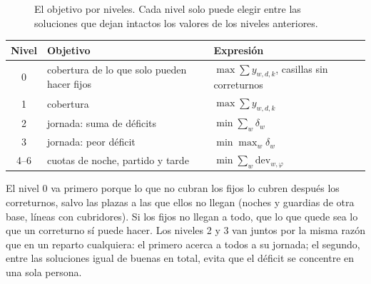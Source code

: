\documentclass[11pt,a4paper]{article}
\begin{document}
\begin{figure}[ht]
\centering
{}
\caption{El objetivo por niveles. Cada nivel solo puede elegir entre las soluciones que dejan
intactos los valores de los niveles anteriores.}
\label{fig:niveles}
\end{figure}

\begin{center}
\begin{tabular}{@{}cll@{}}
  \toprule
  Nivel & Objetivo & Expresión \\
  \midrule
  0 & cobertura de lo que solo pueden hacer fijos & $\max \sum y_{w,d,k}$, casillas sin correturnos \\
  1 & cobertura & $\max \sum y_{w,d,k}$ \\
  2 & jornada: suma de déficits & $\min \sum_w \delta_w$ \\
  3 & jornada: peor déficit & $\min \max_w \delta_w$ \\
  4--6 & cuotas de noche, partido y tarde & $\min \sum_w \mathrm{dev}_{w,\varphi}$ \\
  \bottomrule
\end{tabular}
\end{center}
El nivel 0 va primero porque lo que no cubran los fijos lo cubren después los correturnos, salvo
las plazas a las que ellos no llegan (noches y guardias de otra base, líneas con cubridores). Si
los fijos no llegan a todo, que lo que quede sea lo que un correturno sí puede hacer. Los niveles
2 y 3 van juntos por la misma razón que en un reparto cualquiera: el primero acerca a todos a su
jornada; el segundo, entre las soluciones igual de buenas en total, evita que el déficit se
concentre en una sola persona.
\end{document}
